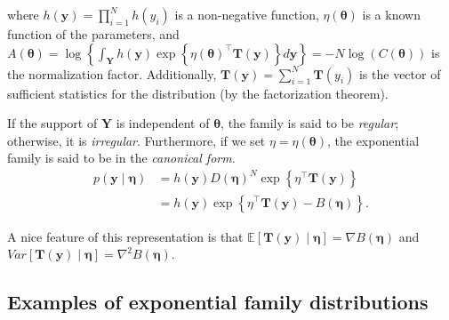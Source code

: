 where \( h(\bm{y}) = \prod_{i=1}^N h(y_i) \) is a non-negative function, \( \eta(\bm{\theta}) \) is a known function of the parameters, and \( A(\bm{\theta}) = \log\left\{ \int_{\bm{Y}} h(\bm{y}) \exp\left\{ \eta(\bm{\theta})^{\top} \bm{T}(\bm{y}) \right\} d\bm{y} \right\} = -N \log\left(C(\bm{\theta})\right) \) is the normalization factor. Additionally, \( \bm{T}(\bm{y}) = \sum_{i=1}^N \bm{T}(y_i) \) is the vector of sufficient statistics for the distribution (by the factorization theorem).

If the support of \( \bm{Y} \) is independent of \( \bm{\theta} \), the family is said to be \textit{regular}; otherwise, it is \textit{irregular}. Furthermore, if we set \( \eta = \eta(\bm{\theta}) \), the exponential family is said to be in the \textit{canonical form}.
\begin{align}
	p(\bm{y}\mid \bm{\eta})&=h(\bm{y})D(\bm{\eta})^N\exp\left\{\eta^{\top}\bm{T}(\bm{y})\right\}\nonumber\\
	&=h(\bm{y})\exp\left\{\eta^{\top}\bm{T}(\bm{y})-B(\bm{\eta})\right\}.\nonumber
\end{align}

A nice feature of this representation is that $\mathbb{E}[\bm{T}(\bm{y})\mid \bm{\eta}]=\nabla B(\bm{\eta})$ and $Var[\bm{T}(\bm{y})\mid \bm{\eta}]=\nabla^2 B(\bm{\eta})$. 

\subsection{Examples of exponential family distributions}

